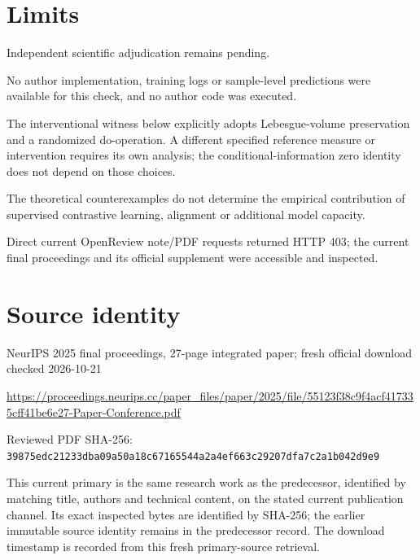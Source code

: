 \documentclass[11pt]{article}
\begin{document}
\section*{Limits}

Independent scientific adjudication remains pending.\par

No author implementation, training logs or sample-level predictions were available for this check, and no author code was executed.\par

The interventional witness below explicitly adopts Lebesgue-volume preservation and a randomized do-operation. A different specified reference measure or intervention requires its own analysis; the conditional-information zero identity does not depend on those choices.\par

The theoretical counterexamples do not determine the empirical contribution of supervised contrastive learning, alignment or additional model capacity.\par

Direct current OpenReview note/PDF requests returned HTTP 403; the current final proceedings and its official supplement were accessible and inspected.\par

\section*{Source identity}

NeurIPS 2025 final proceedings, 27-page integrated paper; fresh official download checked 2026-10-21

\url{https://proceedings.neurips.cc/paper_files/paper/2025/file/55123f38c9f4acf417335cff41be6e27-Paper-Conference.pdf}

Reviewed PDF SHA-256: \nolinkurl{39875edc21233dba09a50a18c67165544a2a4ef663c29207dfa7c2a1b042d9e9}

This current primary is the same research work as the predecessor, identified by matching title, authors and technical content, on the stated current publication channel. Its exact inspected bytes are identified by SHA-256; the earlier immutable source identity remains in the predecessor record. The download timestamp is recorded from this fresh primary-source retrieval.
\end{document}
